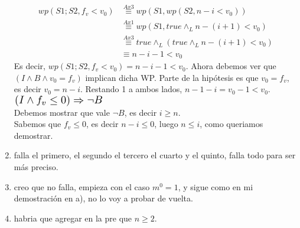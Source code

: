 \documentclass{article}
\begin{document}
\begin{enumerate}[label=\alph*)]
\begin{align*}
		wp(S1;S2,f_v<v_0)&\stackrel{Ax3}{\equiv}wp(S1,wp(S2,n-i<v_0))\\
			&\stackrel{Ax1}{\equiv}wp(S1,true\wedge_L n-(i+1)<v_0)\\
			&\stackrel{Ax3}{\equiv}true\wedge_L(true\wedge_L  n-(i+1)<v_0)\\
			&\equiv n-i-1<v_0
	\end{align*}
	Es decir, $wp(S1;S2,f_v<v_0)=n-i-1<v_0$. Ahora debemos ver que $(I\wedge B\wedge v_0=f_v)$ implican dicha WP. Parte de la 
	hipótesis es que $v_0=f_v$, es decir $v_0=n-i$. Restando 1 a ambos lados, $n-1-i=v_0-1<v_0$.\medskip \\
	$\scalebox{1.3}{$(I\wedge f_v\leq 0)\Rightarrow \neg B$}$\medskip\\
	Debemos mostrar que vale $\neg B$, es decir $i\geq n$.\\
	Sabemos que $f_v\leq 0$, es decir $n-i\leq 0$, luego $n\leq i$, como queriamos demostrar.
	
	\item falla el primero, el segundo el tercero el cuarto y el quinto, falla todo para ser más preciso.
	\item creo que no falla, empieza con el caso $m^0=1$, y sigue como en mi demostración en a), no lo
	voy a probar de vuelta.
	\item habria que agregar en la pre que $n\geq 2$.
\end{enumerate}
\end{document}
